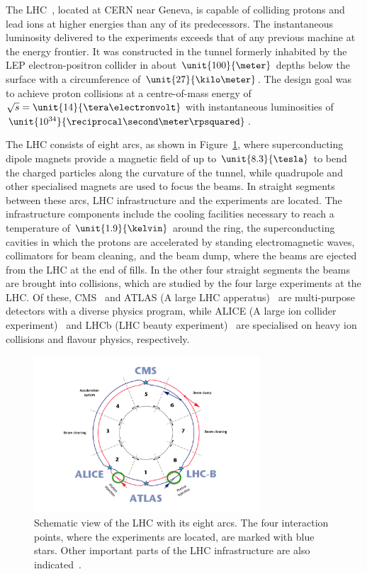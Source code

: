 \label{sec:LHC}
The LHC~\cite{LHC}, located at CERN near Geneva, is capable of colliding protons and lead ions at higher energies than any of its predecessors. The instantaneous luminosity delivered to the experiments exceeds that of any previous machine at the energy frontier. It was constructed in the tunnel formerly inhabited by the LEP electron-positron collider in about $\unit{100}{\meter}$ depths below the surface with a circumference of $\unit{27}{\kilo\meter}$. The design goal was to achieve proton collisions at a centre-of-mass energy of $\sqrt{s} = \unit{14}{\tera\electronvolt}$ with instantaneous luminosities of $\unit{10^{34}}{\reciprocal\second\meter\rpsquared}$. 

The LHC consists of eight arcs, as shown in Figure~\ref{fig:LHC}, where superconducting dipole magnets provide a magnetic field of up to $\unit{8.3}{\tesla}$ to bend the charged particles along the curvature of the tunnel, while quadrupole and other specialised magnets are used to focus the beams. In straight segments between these arcs, LHC infrastructure and the experiments are located. The infrastructure components include the cooling facilities necessary to reach a temperature of $\unit{1.9}{\kelvin}$ around the ring, the superconducting cavities in which the protons are accelerated by standing electromagnetic waves, collimators for beam cleaning, and the beam dump, where the beams are ejected from the LHC at the end of fills. In the other four straight segments the beams are brought into collisions, which are studied by the four large experiments at the LHC. Of these, CMS~\cite{CMS} and ATLAS (A large LHC apperatus)~\cite{ATLAS} are multi-purpose detectors with a diverse physics program, while ALICE (A large ion collider experiment)~\cite{ALICE} and LHCb (LHC beauty experiment)~\cite{LHCb} are specialised on heavy ion collisions and flavour physics, respectively. 

\begin{figure}[htbp]
\centering
  \includegraphics[width=0.75\textwidth]{plots/LHC/LHC_scetch.png}
\caption{Schematic view of the LHC with its eight arcs. The four interaction points, where the experiments are located, are marked with blue stars. Other important parts of the LHC infrastructure are also indicated~\cite{LHCScetch}.}
\label{fig:LHC}
\end{figure}

